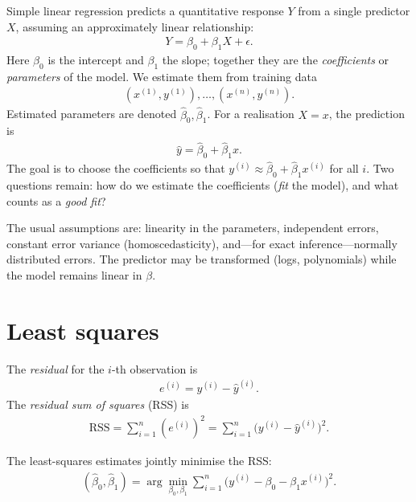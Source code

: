 \documentclass[a4paper, 12pt]{book}
\begin{document}
Simple linear regression predicts a quantitative response $Y$ from a single predictor
$X$, assuming an approximately linear relationship:
\begin{align}
    Y = \beta_0 + \beta_1 X + \epsilon.
\end{align}
Here $\beta_0$ is the intercept and $\beta_1$ the slope; together they are the
\emph{coefficients} or \emph{parameters} of the model. We estimate them from training
data
\begin{align}
    (x^{(1)}, y^{(1)}), \ldots, (x^{(n)}, y^{(n)}).
\end{align}
Estimated parameters are denoted $\hat{\beta}_0, \hat{\beta}_1$. For a realisation
$X=x$, the prediction is
\begin{align}
    \hat{y} = \hat{\beta}_0 + \hat{\beta}_1 x.
\end{align}
The goal is to choose the coefficients so that
$y^{(i)} \approx \hat{\beta}_0 + \hat{\beta}_1 x^{(i)}$ for all $i$. Two questions
remain: how do we estimate the coefficients (\emph{fit} the model), and what counts
as a \emph{good fit}?

The usual assumptions are: linearity in the parameters, independent errors,
constant error variance (homoscedasticity), and---for exact inference---normally
distributed errors. The predictor may be transformed (logs, polynomials) while the
model remains linear in $\beta$.

\section{Least squares}

\begin{definition}
The \emph{residual} for the $i$-th observation is
\begin{align}
    e^{(i)} = y^{(i)} - \hat{y}^{(i)}.
\end{align}
The \emph{residual sum of squares} (RSS) is
\begin{align}
    \mathrm{RSS}
    = \sum_{i=1}^n (e^{(i)})^2
    = \sum_{i=1}^n \big(y^{(i)} - \hat{y}^{(i)}\big)^2.
\end{align}
\end{definition}

\begin{definition}
The least-squares estimates jointly minimise the RSS:
\begin{align}
    (\hat{\beta}_0, \hat{\beta}_1)
    = \arg\min_{\beta_0,\beta_1}
    \sum_{i=1}^n \big(y^{(i)} - \beta_0 - \beta_1 x^{(i)}\big)^2.
\end{align}
\end{definition}
\end{document}
